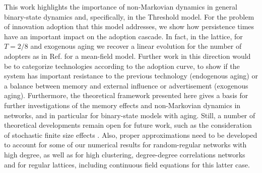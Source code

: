 This work highlights the importance of non-Markovian dynamics in general  binary-state dynamics and, specifically, in the Threshold model. For the problem of innovation adoption that this model addresses, we show how persistence times have an important impact on the adoption cascade. In fact, in the lattice, for $T = 2/8$ and exogenous aging we recover a linear evolution for the number of adopters as in Ref. \cite{goncalves-2012} for a mean-field model. Further work in this direction would be to categorize technologies according to the adoption curve, to show if the system has important resistance to the previous technology (endogenous aging) or a balance between memory and external influence or advertisement (exogenous aging). Furthermore, the theoretical framework presented here gives a basis for further investigations of the memory effects and non-Markovian dynamics in networks, and in particular for  binary-state models with aging. Still, a number of theoretical developments remain open for future work, such as the consideration of stochastic finite size effects \cite{peralta-2020B}. Also, proper approximations need to be developed to account for some of our numerical results for random-regular networks with high degree, as well as for high clustering, degree-degree correlations networks and for regular lattices, including continuous field equations for this latter case. 
